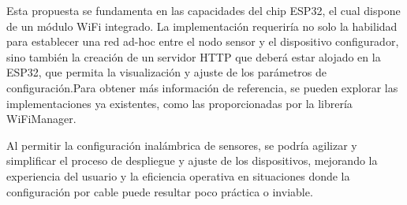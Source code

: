 Esta propuesta se fundamenta en las capacidades del chip ESP32, el cual dispone de un módulo WiFi integrado. La implementación requeriría
no solo la habilidad para establecer una red ad-hoc entre el nodo sensor y el dispositivo configurador, sino también la creación de un servidor HTTP
que deberá estar alojado en la ESP32, que permita la visualización y ajuste de los parámetros de configuración.Para obtener más información de referencia, se
pueden explorar las implementaciones ya existentes, como las proporcionadas por la librería WiFiManager.

Al permitir la configuración inalámbrica de sensores, se podría agilizar y simplificar el proceso de despliegue y ajuste de los dispositivos,
mejorando la experiencia del usuario y la eficiencia operativa en situaciones donde la configuración por cable puede resultar poco práctica o inviable.

